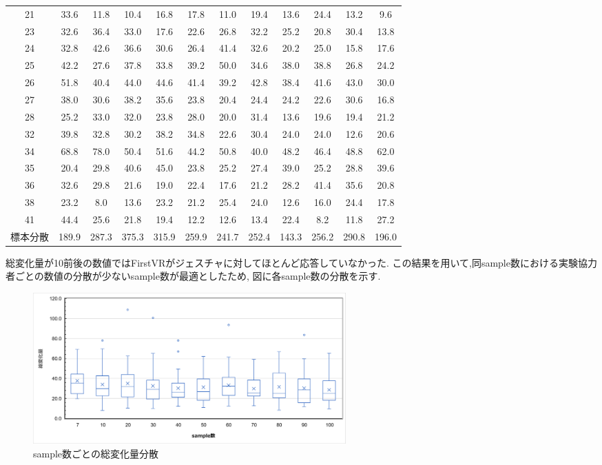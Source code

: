 \documentclass{ltjsreport}
\begin{document}
\begin{table}[H]
\begin{center}
\begin{tabular}{c|ccccccccccc}
			21 & 33.6 & 11.8 & 10.4 & 16.8 & 17.8 & 11.0 & 19.4 & 13.6 & 24.4 & 13.2 & 9.6 \\
			23 & 32.6 & 36.4 & 33.0 & 17.6 & 22.6 & 26.8 & 32.2 & 25.2 & 20.8 & 30.4 & 13.8 \\
			24 & 32.8 & 42.6 & 36.6 & 30.6 & 26.4 & 41.4 & 32.6 & 20.2 & 25.0 & 15.8 & 17.6 \\
			25 & 42.2 & 27.6 & 37.8 & 33.8 & 39.2 & 50.0 & 34.6 & 38.0 & 38.8 & 26.8 & 24.2 \\
			26 & 51.8 & 40.4 & 44.0 & 44.6 & 41.4 & 39.2 & 42.8 & 38.4 & 41.6 & 43.0 & 30.0 \\
			27 & 38.0 & 30.6 & 38.2 & 35.6 & 23.8 & 20.4 & 24.4 & 24.2 & 22.6 & 30.6 & 16.8 \\
			28 & 25.2 & 33.0 & 32.0 & 23.8 & 28.0 & 20.0 & 31.4 & 13.6 & 19.6 & 19.4 & 21.2 \\
			32 & 39.8 & 32.8 & 30.2 & 38.2 & 34.8 & 22.6 & 30.4 & 24.0 & 24.0 & 12.6 & 20.6 \\
			34 & 68.8 & 78.0 & 50.4 & 51.6 & 44.2 & 50.8 & 40.0 & 48.2 & 46.4 & 48.8 & 62.0 \\
			35 & 20.4 & 29.8 & 40.6 & 45.0 & 23.8 & 25.2 & 27.4 & 39.0 & 25.2 & 28.8 & 39.6 \\
			36 & 32.6 & 29.8 & 21.6 & 19.0 & 22.4 & 17.6 & 21.2 & 28.2 & 41.4 & 35.6 & 20.8 \\
			38 & 23.2 & 8.0 & 13.6 & 23.2 & 21.2 & 25.4 & 24.0 & 12.6 & 16.0 & 24.4 & 17.8 \\
			41 & 44.4 & 25.6 & 21.8 & 19.4 & 12.2 & 12.6 & 13.4 & 22.4 & 8.2 & 11.8 & 27.2 \\ \hline
			標本分散&189.9 & 287.3 & 375.3 & 315.9 & 259.9 & 241.7 & 252.4 & 143.3 & 256.2 & 290.8 & 196.0 \\
			
		\end{tabular}
		\end{center}
		\end{table}

		総変化量が10前後の数値ではFirstVRがジェスチャに対してほとんど応答していなかった.
		この結果を用いて,同sample数における実験協力者ごとの数値の分散が少ないsample数が最適としたため,
		図に各sample数の分散を示す.

		\begin{figure}[H]
		\centering
		\includegraphics[width = 12cm]{../figs/FVRALL.png}
		\caption{sample数ごとの総変化量分散}
		\label{fig:FVRdata}
		\end{figure}
\end{document}
